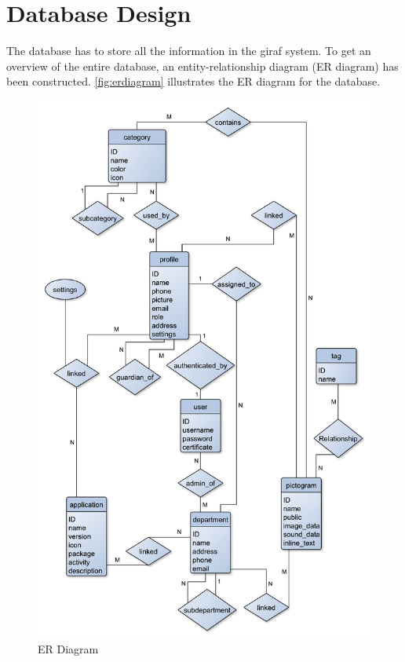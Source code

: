 \section{Database Design}
The database has to store all the information in the \ac{giraf} system.
To get an overview of the entire database, an entity-relationship diagram (ER diagram) has been constructed. \autoref{fig:erdiagram} illustrates the ER diagram for the database.

\begin{figure}[hptb]
\begin{center}
\includegraphics[width=\textwidth]{img/ER_diagram3.pdf}
\caption{ER Diagram}
\label{fig:erdiagram}
\end{center}
\end{figure}

